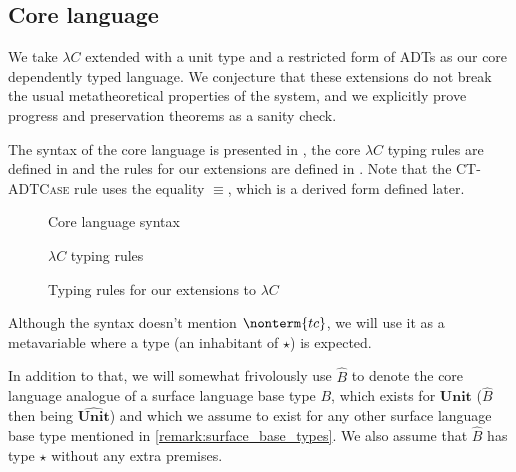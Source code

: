\documentclass[a4paper]{article}
\newcommand{\Unit}{\textbf{Unit}}
\newcommand{\Unitc}{\widehat{\textbf{Unit}}}
\begin{document}
\subsection{Core language}

We take $\lambda C$ \cite{TTFPLambdaC}
extended with a unit type
and a restricted form of ADTs as our core dependently typed language.
We conjecture that these extensions
do not break the usual metatheoretical properties of the system,
and we explicitly prove progress and preservation theorems as a sanity check.

The syntax of the core language is presented in ,
the core $\lambda C$ typing rules are defined in 
and the rules for our extensions are defined in .
Note that the \textsc{CT-ADTCase} rule uses the equality $\equiv$,
which is a derived form defined later.

\begin{figure}[ht]
  \footnotesize
  \caption{Core language syntax}
  \label{fig:core_syntax}
\end{figure}

\begin{figure}[ht]
  \footnotesize
  \caption{$\lambda C$ typing rules}
  \label{fig:core_typing}
\end{figure}
\begin{figure}[ht]
  \footnotesize
  \caption{Typing rules for our extensions to $\lambda C$}
  \label{fig:core_typing_exts}
\end{figure}

Although the syntax doesn't mention $\nonterm{tc}$, we will use it as a metavariable
where a type (an inhabitant of $\star$) is expected.

In addition to that, we will somewhat frivolously use $\hat B$
to denote the core language analogue of a surface language base type $B$,
which exists for $\Unit$ ($\hat B$ then being $\Unitc$)
and which we assume to exist for any other surface language base type
mentioned in \cref{remark:surface_base_types}.
We also assume that $\hat B$ has type $\star$ without any extra premises.

\newcommand{\dast}{\ **\ }
\end{document}
